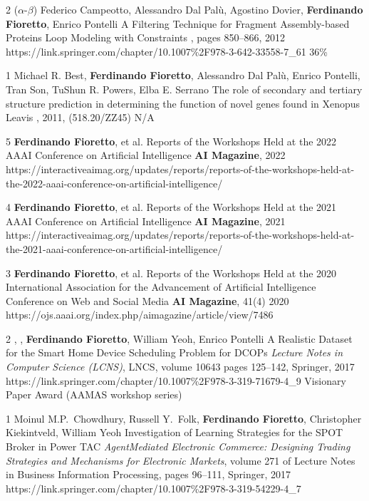 \begin{pubs}
	\confentry 
		{2} %
		{($\alpha$-$\beta$) 
		Federico Campeotto, Alessandro Dal Pal\`{u}, Agostino Dovier, {\bf Ferdinando Fioretto}, Enrico Pontelli}
		{A Filtering Technique for Fragment Assembly-based Proteins Loop Modeling with Constraints} 
		{\procCP, pages 850--866, 2012}
		{https://link.springer.com/chapter/10.1007\%2F978-3-642-33558-7\_61}
		{36\%}

	\confentry
		{1} %
		{Michael R. Best, {\bf Ferdinando Fioretto}, Alessandro Dal Pal\`{u}, Enrico Pontelli, Tran Son, TuShun R. Powers, Elba E. Serrano}
		{The role of secondary and tertiary structure prediction in determining the function of novel genes found in Xenopus Leavis}
		{, 2011, (518.20/ZZ45)}{}
		{N/A}
\end{pubs}

\begin{pubs}
\journalentry
	{5} %
	{{\bf Ferdinando Fioretto}, et al.} 
	{Reports of the Workshops Held at the 2022 AAAI Conference on Artificial Intelligence}
	{{\bf AI Magazine}, 2022}
	{https://interactiveaimag.org/updates/reports/reports-of-the-workshops-held-at-the-2022-aaai-conference-on-artificial-intelligence/}

\journalentry
	{4} %
	{{\bf Ferdinando Fioretto}, et al.} 
	{Reports of the Workshops Held at the 2021 AAAI Conference on Artificial Intelligence}
	{{\bf AI Magazine}, 2021}
	{https://interactiveaimag.org/updates/reports/reports-of-the-workshops-held-at-the-2021-aaai-conference-on-artificial-intelligence/}

\journalentry
	{3} %
	{{\bf Ferdinando Fioretto}, et al.} 
	{Reports of the Workshops Held at the 2020 International Association for the Advancement of Artificial Intelligence Conference on Web and Social Media}
	{{\bf AI Magazine},  41(4) 2020}
	{https://ojs.aaai.org/index.php/aimagazine/article/view/7486}

\journalentryAwd
	{2} %
	{, , {\bf Ferdinando Fioretto}, William Yeoh, Enrico Pontelli}
	{A Realistic Dataset for the Smart Home Device Scheduling Problem for DCOPs}
	{\emph{Lecture Notes in Computer Science (LCNS)}, LNCS, volume 10643 pages 125--142, Springer, 2017}
	{https://link.springer.com/chapter/10.1007\%2F978-3-319-71679-4\_9}
	{Visionary Paper Award}
	{(AAMAS workshop series)}

\journalentry
	{1} %
	{Moinul M.P.~Chowdhury, Russell Y.~Folk, {\bf Ferdinando Fioretto}, Christopher Kiekintveld, William Yeoh}
	{Investigation of Learning Strategies for the SPOT Broker in Power TAC}
	{\emph{AgentMediated Electronic Commerce: Designing Trading Strategies and Mechanisms for Electronic Markets}, volume 271 of Lecture Notes in Business Information Processing, 
	    pages 96–111, Springer, 2017}
    {https://link.springer.com/chapter/10.1007\%2F978-3-319-54229-4\_7}
\end{pubs}


